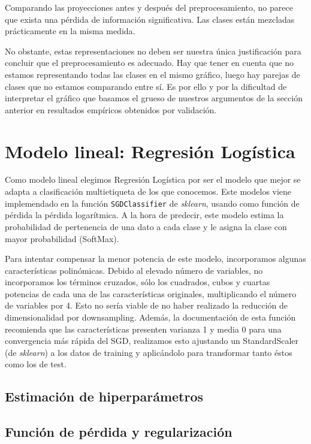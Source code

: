 \documentclass[a4]{article}
\begin{document}
Comparando las proyecciones antes y después del preprocesamiento, no
parece que exista una pérdida de información significativa. Las
clases están mezcladas prácticamente en la misma medida.

No obstante, estas representaciones no deben ser nuestra única
justificación para concluir que el preprocesamiento es adecuado. Hay
que tener en cuenta que no estamos representando todas las clases en
el mismo gráfico, luego hay parejas de clases que no estamos
comparando entre sí. Es por ello y por la dificultad de interpretar el gráfico que basamos el grueso de nuestros argumentos de la sección
anterior en resultados empíricos obtenidos por validación.

\section{Modelo lineal: Regresión Logística}

Como modelo lineal elegimos Regresión Logística por ser el modelo que
mejor se adapta a clasificación multietiqueta de los que
conocemos. Este modelos viene implemendado en la función
\texttt{SGDClassifier} de \textit{sklearn}, usando como función de
pérdida la pérdida logarítmica. A la hora de predecir, este modelo
estima la probabilidad de pertenencia de una dato a cada clase y le
asigna la clase con mayor probabilidad (SoftMax).

Para intentar compensar la menor potencia de este modelo, incorporamos
algunas características polinómicas. Debido al elevado número de
variables, no incorporamos los términos cruzados, sólo los cuadrados,
cubos y cuartas potencias de cada una de las características
originales, multiplicando el número de variables por 4. Esto no sería
viable de no haber realizado la reducción de dimensionalidad por
downsampling. Además, la documentación de esta función recomienda que
las características presenten varianza 1 y media 0 para una
convergencia más rápida del SGD, realizamos esto ajustando un
StandardScaler (de \textit{sklearn}) a los datos de training y
aplicándolo para transformar tanto éstos como los de test.

\subsection{Estimación de hiperparámetros}

\subsection{Función de pérdida y regularización}
\end{document}
